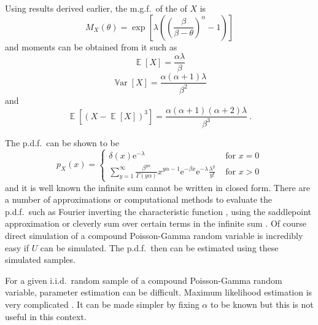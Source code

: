 \documentclass[12pt, a4paper]{memoir}
\DeclareMathOperator{\expectation}{\mathbb{E}}
\DeclareMathOperator{\variance}{\mathbb{V}ar}
\newcommand{\euler}{\mathrm{e}}
\begin{document}
Using results derived earlier, the m.g.f.~of the of $X$ is
\begin{equation}
M_X(\theta)=\exp\left[\lambda\left(\left(\frac{\beta}{\beta-\theta}\right)^{\alpha}-1\right)\right]
\end{equation}
and moments can be obtained from it such as
\begin{equation}
\expectation\left[X\right]=\frac{\alpha\lambda}{\beta}
\end{equation}
\begin{equation}
\variance\left[X\right]=\frac{\alpha(\alpha+1)\lambda}{\beta^2}
\label{eq:compoundPoisson_variance}
\end{equation}
and
\begin{equation}
\expectation\left[(X-\expectation[X])^3\right] = \frac{\alpha(\alpha+1)(\alpha+2)\lambda}{\beta^3} \ .
\end{equation}

The p.d.f.~can be shown to be
\begin{equation}
p_X(x) = 
\begin{cases}
\delta(x) \euler^{-\lambda} & \text{ for } x=0 \\ 
\sum_{y=1}^{\infty}\frac{\beta^{y\alpha}}{\Gamma(y\alpha)}x^{y\alpha-1}\euler^{-\beta x}\euler^{-\lambda}\frac{\lambda^y}{y!} & \text{ for } x>0
\end{cases}
\label{eq:compoundPoisson_pdf}
\end{equation}
and it is well known the infinite sum cannot be written in closed form. There are a number of approximations or computational methods to evaluate the p.d.f.~such as Fourier inverting the characteristic function \citep{dunn2008evaluation}, using the saddlepoint approximation \citep{daniels1954saddlepoint} or cleverly sum over certain terms in the infinite sum \citep{dunn2005series}. Of course direct simulation of a compound Poisson-Gamma random variable is incredibly easy if $U$ can be simulated. The p.d.f.~then can be estimated using these simulated samples.

For a given i.i.d.~random sample of a compound Poisson-Gamma random variable, parameter estimation can be difficult. Maximum likelihood estimation is very complicated \citep{withers2011compound}. It can be made simpler by fixing $\alpha$ to be known \citep{withers2011compound} but this is not useful in this context.
\end{document}

